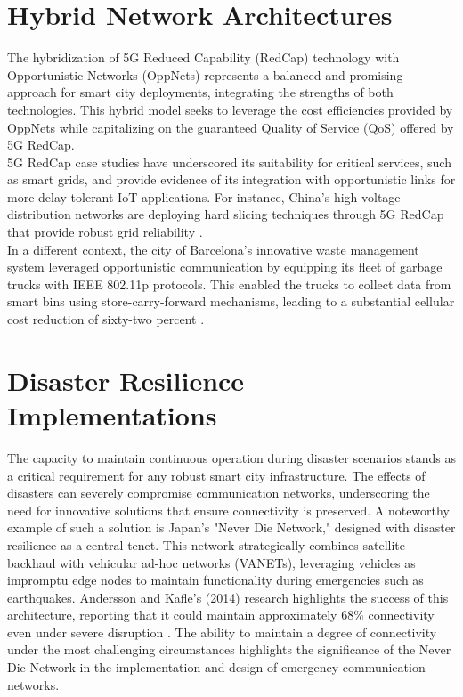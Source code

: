 \documentclass[10pt,a4paper]{report}
\begin{document}
\section{Hybrid Network Architectures}
The hybridization of 5G Reduced Capability (RedCap) technology with Opportunistic
Networks (OppNets) represents a balanced and promising approach for smart city
deployments, integrating the strengths of both technologies. This hybrid model
seeks to leverage the cost efficiencies provided by OppNets while capitalizing
on the guaranteed Quality of Service (QoS) offered by 5G RedCap.\\
5G RedCap case studies have underscored its suitability for critical services,
such as smart grids, and provide evidence of its integration with opportunistic
links for more delay-tolerant IoT applications. For instance, China's
high-voltage distribution networks are deploying hard slicing techniques through
5G RedCap that provide robust grid reliability \cite{GSMA2024}.\\
In a different context, the city of Barcelona's innovative waste management system
leveraged opportunistic communication by equipping its fleet of garbage trucks
with IEEE 802.11p protocols. This enabled the trucks to collect data from smart
bins using store-carry-forward mechanisms, leading to a substantial cellular
cost reduction of sixty-two percent \cite{Sinaeepourfard_2016}.

\section{Disaster Resilience Implementations}
The capacity to maintain continuous operation during disaster scenarios stands as
a critical requirement for any robust smart city infrastructure. The effects of
disasters can severely compromise communication networks, underscoring the need
for innovative solutions that ensure connectivity is preserved. A noteworthy
example of such a solution is Japan's "Never Die Network," designed with disaster
resilience as a central tenet. This network strategically combines satellite
backhaul with vehicular ad-hoc networks (VANETs), leveraging vehicles as
impromptu edge nodes to maintain functionality during emergencies such as
earthquakes. Andersson and Kafle's (2014) research highlights the success of
this architecture, reporting that it could maintain approximately 68\%
connectivity even under severe disruption \cite{Andersson_2014}. The ability to
maintain a degree of connectivity under the most challenging circumstances
highlights the significance of the Never Die Network in the implementation
and design of emergency communication networks.
\end{document}
